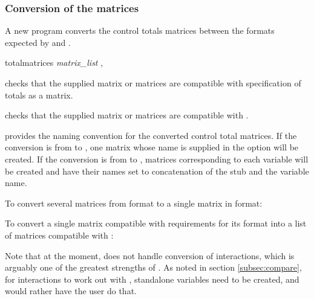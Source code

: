 \subsubsection{Conversion of the matrices}

A new program  converts the control totals matrices between
the formats expected by  and  \citep{valliant:dever:2017}.

\begin{stsyntax}
totalmatrices
{\it matrix\_list}
,
\end{stsyntax}

\hangpara
{} checks that the supplied matrix or matrices are compatible with 
specification of totals as a matrix.

\hangpara
{} checks that the supplied matrix or matrices are compatible with .

\hangpara
{} provides the naming convention for the converted control total matrices.
If the conversion is from  to , one matrix whose name is supplied in
the  option will be created. If the conversion is from  to
, matrices corresponding to each variable will be created and have their names
set to concatenation of the stub and the variable name.

To convert several matrices from  format to a single matrix
in  format:

\begin{stlog}
\nullskip
\end{stlog}

To convert a single matrix compatible with  requirements for its
 format into a list of matrices compatible with
:

\begin{stlog}
\nullskip
\end{stlog}

Note that at the moment,  does not handle conversion
of interactions, which is arguably one of the greatest strengths of .
As noted in section \ref{subsec:compare}, for interactions to work out with ,
standalone variables need to be created, and  would rather
have the user do that.

